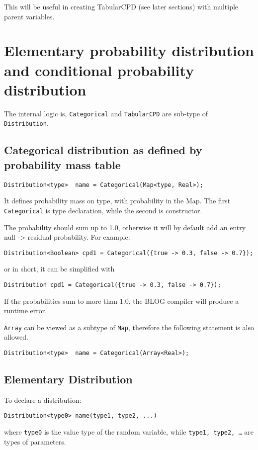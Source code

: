 \documentclass[12pt]{article}
\begin{document}
This will be useful in creating TabularCPD (see later sections) with multiple parent variables.



\section{Elementary probability distribution and conditional probability distribution}
\label{sec:distribution}
The internal logic is, \texttt{Categorical} and \texttt{TabularCPD} are sub-type of \texttt{Distribution}.

\subsection{Categorical distribution as defined by probability mass table}
\begin{verbatim}
Distribution<type>  name = Categorical(Map<type, Real>);
\end{verbatim}
It defines probability mass on type, with probability in the Map.
The first \texttt{Categorical} is type declaration, while the second is constructor. 

The probability should sum up to 1.0, otherwise it will by default add an entry null -> residual probability.
For example:
\begin{verbatim}
Distribution<Boolean> cpd1 = Categorical({true -> 0.3, false -> 0.7});
\end{verbatim}
or in short, it can be simplified with 
\begin{verbatim}
Distribution cpd1 = Categorical({true -> 0.3, false -> 0.7});
\end{verbatim}

If the probabilities sum to more than 1.0, the BLOG compiler will produce a runtime error.

\texttt{Array} can be viewed as a subtype of \texttt{Map}, therefore the following statement is also allowed.
\begin{verbatim}
Distribution<type>  name = Categorical(Array<Real>);
\end{verbatim}



\subsection{Elementary Distribution}
To declare a distribution:
\begin{verbatim}
Distribution<type0> name(type1, type2, ...)
\end{verbatim}
where {\tt type0}  is the value type of  the random variable, while {\tt type1, type2, \dots} are types of parameters.
\end{document}
